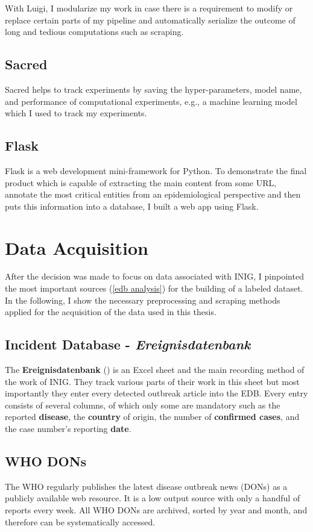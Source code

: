   With Luigi, I modularize my work in case there is a requirement to modify or replace certain parts of my pipeline and automatically serialize the outcome of long and tedious computations such as scraping.

\subsection{Sacred}
  Sacred helps to track experiments by saving the hyper-parameters, model name, and performance of computational experiments, e.g., a machine learning model which I used to track my experiments.

\subsection{Flask}
  Flask is a web development mini-framework for Python.
  To demonstrate the final product which is capable of extracting the main content from some URL, annotate the most critical entities from an epidemiological perspective and then puts this information into a database, I built a web app using Flask.

\section{Data Acquisition}
  After the decision was made to focus on data associated with INIG, I pinpointed the most important sources (\ref{edb analysis}) for the building of a labeled dataset.
  In the following, I show the necessary preprocessing and scraping methods applied for the acquisition of the data used in this thesis.

\subsection{Incident Database - \textit{Ereignisdatenbank}}
  The \textbf{Ereignisdatenbank} () is an Excel sheet and the main recording method of the work of INIG.
  They track various parts of their work in this sheet but most importantly they enter every detected outbreak article into the EDB.
  Every entry consists of several columns, of which only some are mandatory such as the reported \textbf{disease}, the \textbf{country} of origin, the number of \textbf{confirmed cases}, and the case number's reporting \textbf{date}.

\subsection{WHO DONs}
  The WHO regularly publishes the latest disease outbreak news (DONs) as a publicly available web resource.
  It is a low output source with only a handful of reports every week.
  All WHO DONs are archived, sorted by year and month, and therefore can be systematically accessed.

